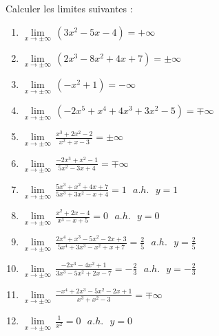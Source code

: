 \begin{solution}
Calculer les limites suivantes :
\begin{enumerate}
\item $\underset{x\to \pm \infty }{\mathop{\lim }}\,\left( 3{{x}^{2}}-5x-4 \right)=+\infty $
\item $\underset{x\to \pm \infty }{\mathop{\lim }}\,\left( 2{{x}^{3}}-8{{x}^{2}}+4x+7 \right)=\pm \infty $
\item $\underset{x\to \pm \infty }{\mathop{\lim }}\,\left( -{{x}^{2}}+1 \right)=-\infty $
\item $\underset{x\to \pm \infty }{\mathop{\lim }}\,\left( -2{{x}^{5}}+{{x}^{4}}+4{{x}^{3}}+3{{x}^{2}}-5 \right)=\mp \infty $
\item $\underset{x\to \pm \infty }{\mathop{\lim }}\,\frac{{{x}^{3}}+2{{x}^{2}}-2}{{{x}^{2}}+x-3}=\pm \infty $
\item $\underset{x\to \pm \infty }{\mathop{\lim }}\,\frac{-2{{x}^{3}}+{{x}^{2}}-1}{5{{x}^{2}}-3x+4}=\mp \infty $
\item $\underset{x\to \pm \infty }{\mathop{\lim }}\,\frac{5{{x}^{3}}+{{x}^{2}}+4x+7}{5{{x}^{3}}+3{{x}^{2}}-x+4}=1\text{  }a.h.\text{ }y=1$
\item $\underset{x\to \pm \infty }{\mathop{\lim }}\,\frac{{{x}^{2}}+2x-4}{{{x}^{3}}-x+5}=0\text{  }a.h.\text{ }y=0$
\item $\underset{x\to \pm \infty }{\mathop{\lim }}\,\frac{2{{x}^{4}}+{{x}^{3}}-5{{x}^{2}}-2x+3}{5{{x}^{4}}+3{{x}^{3}}-{{x}^{2}}+x+7}=\frac{2}{5}\text{  }a.h.\text{ }y=\frac{2}{5}$
\item $\underset{x\to \pm \infty }{\mathop{\lim }}\,\frac{-2{{x}^{3}}-4{{x}^{2}}+1}{3{{x}^{3}}-5{{x}^{2}}+2x-7}=-\frac{2}{3}\text{  }a.h.\text{ }y=-\frac{2}{3}$
\item $\underset{x\to \pm \infty }{\mathop{\lim }}\,\frac{-{{x}^{4}}+2{{x}^{3}}-5{{x}^{2}}-2x+1}{{{x}^{3}}+{{x}^{2}}-3}=\mp \infty $
\item $\underset{x\to \pm \infty }{\mathop{\lim }}\,\frac{1}{{{x}^{2}}}=0\text{  }a.h.\text{ }y=0$
\end{enumerate}
\end{solution}